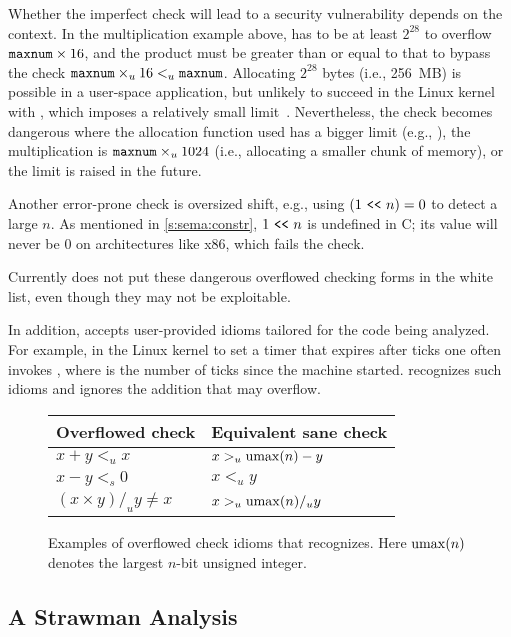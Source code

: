 Whether the imperfect check will lead to a security vulnerability
depends on the context.  In the multiplication example above,
 has to be at least $2^{28}$ to overflow $\texttt{maxnum}
\times 16$, and the product must be greater than or equal to that
to bypass the check $\texttt{maxnum} \times_u 16 <_u \texttt{maxnum}$.
Allocating $2^{28}$ bytes (i.e., 256~MB) is possible in a user-space
application, but unlikely to succeed in the Linux kernel with
, which imposes a relatively small
limit~\cite[\chapterautorefname~8]{ldd3}.  Nevertheless, the check
becomes dangerous where the allocation function used has a bigger
limit (e.g., ), the multiplication is $\texttt{maxnum}
\times_u 1024$ (i.e., allocating a smaller chunk of memory), or the
 limit is raised in the future.

Another error-prone check is oversized shift, e.g., using $(1 \ \texttt{<}\texttt{<}\ 
n) = 0$ to detect a large $n$.  As mentioned in \autoref{s:sema:constr},
${1 \ \texttt{<}\texttt{<}\  n}$ is undefined in C; its value will never be 0 on
architectures like x86, which fails the check.

Currently \sys does not put these dangerous overflowed checking
forms in the white list, even though they may not be exploitable.

In addition, \sys accepts user-provided idioms tailored for the
code being analyzed.  For example, in the Linux kernel to set a
timer that expires after  ticks one often invokes
, where  is the
number of ticks since the machine started.  \sys recognizes
such idioms and ignores the addition  that may
overflow.

\begin{figure}
\centering
\begin{tabular}{ll}
\toprule
Overflowed check & Equivalent sane check \\ \midrule
$x + y <_u x$ & $x >_u \operatorname{umax}(n) - y$ \\
$x - y <_s 0$ & $x <_u y$ \\
$(x \times y) /_u y \neq x$ & $x >_u \operatorname{umax}(n) /_u y$   \\
\bottomrule
\end{tabular}
\caption{Examples of overflowed check idioms that \sys recognizes.
Here $\operatorname{umax}(n)$ denotes the largest $n$-bit unsigned integer.}
\label{f:whitelist}
\end{figure}


\subsection{A Strawman Analysis}

